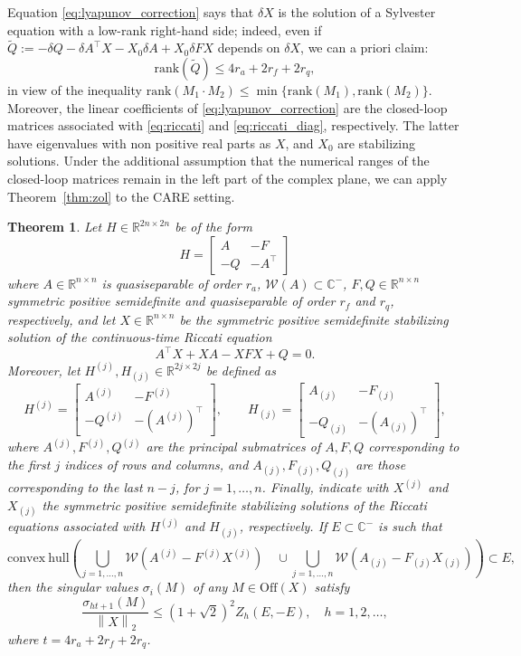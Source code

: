 \documentclass[a4paper,10pt]{article}
\def\rank{\mathrm{rank}}
\newcommand{\norm}[1]{\left\lVert#1\right\rVert}
\newtheorem{theorem}[definition]{Theorem}
\begin{document}
Equation \eqref{eq:lyapunov_correction} says that $\delta X$ is the solution of a Sylvester equation with a low-rank right-hand side; indeed, even if $\widetilde Q:= -\delta Q -\delta A^\top X-X_0\delta A+ X_0\delta FX$  depends on $\delta X$, we can a priori claim: 
$$
\rank\left(\widetilde Q\right)\leq  4r_a+2r_f+2r_q,
$$
in view of the inequality $\rank(M_1\cdot M_2)\le \min\{\rank(M_1), \rank(M_2)\}$. 
Moreover, the linear coefficients of \eqref{eq:lyapunov_correction} are the closed-loop matrices associated with \eqref{eq:riccati} and \eqref{eq:riccati_diag}, respectively. The latter have  eigenvalues with non positive real parts as $X$, and $X_0$ are stabilizing solutions.  Under the additional assumption that the numerical ranges  of the closed-loop matrices remain in the left part of the complex plane,  we can apply Theorem~\ref{thm:zol} to the CARE setting.
\begin{theorem}\label{thm:sing-decay}
	Let $H\in\mathbb R^{2n\times 2n}$ be of the form
	$$
	H=\begin{bmatrix}
		A&-F\\
		-Q&-A^\top
	\end{bmatrix}
	$$
	where $A\in\mathbb R^{n\times n}$ is  quasiseparable of order $r_a$, $\mathcal W(A)\subset\mathbb C^{-}$, $F,Q\in\mathbb R^{n\times n}$ symmetric positive semidefinite  and quasiseparable of order $r_f$ and $r_q$, respectively, and let $X\in\mathbb R^{n\times n}$ be the symmetric positive semidefinite stabilizing solution of the continuous-time Riccati equation 
	$$
	A^\top X+XA-XFX+Q=0.
	$$
	Moreover, let $H^{(j)},H_{(j)}\in\mathbb R^{2j\times 2j}$ be defined as
	$$
	H^{(j)}=\begin{bmatrix}
		A^{(j)}&-F^{(j)}\\
		-Q^{(j)}&-(A^{(j)})^\top
	\end{bmatrix},\qquad H_{(j)}=\begin{bmatrix}
		A_{(j)}&-F_{(j)}\\
		-Q_{(j)}&-(A_{(j)})^\top
	\end{bmatrix},
	$$
	where $A^{(j)},F^{(j)},Q^{(j)}$  are the principal submatrices of $A,F,Q$ corresponding to the first $j$ indices of rows and columns, and $A_{(j)},F_{(j)},Q_{(j)}$ are those corresponding to the last $n-j$, for $j=1,\dots, n$. Finally, indicate with $X^{(j)}$ and $X_{(j)}$ the symmetric positive semidefinite stabilizing solutions of the Riccati equations associated with $H^{(j)}$ and $H_{(j)}$, respectively. 
	If $E\subset \mathbb C^-$ is such that
	$$
	\mathrm{convex\ hull}\left(\bigcup_{j=1,\dots, n}\mathcal W(A^{(j)} - F^{(j)}X^{(j)}) \quad \cup  \bigcup_{j=1,\dots,n}\mathcal W(A_{(j)} - F_{(j)}X_{(j)})\right)\subset E,
	$$
	then the singular values $\sigma_i(M)$ of any $M\in\mathrm{Off}(X)$ satisfy
	$$
	\frac{\sigma_{ht+1}(M)}{\norm{X}_2}\le (1+\sqrt 2)^2 Z_h(E,-E), \quad h=1,2,\dots, 
	$$
	where $t=4r_a+2r_f+2r_q$.
\end{theorem}
\end{document}
